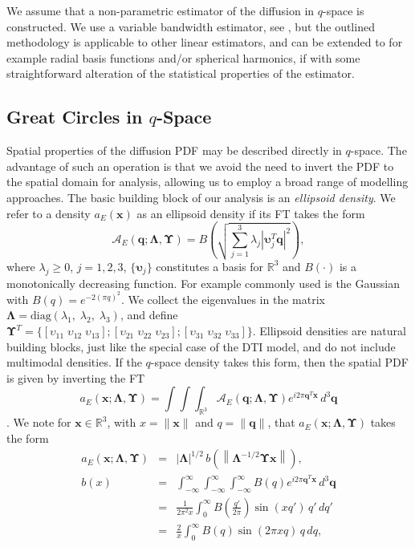 \documentclass[dvips,aoas,preprint]{imsart}
\numberwithin{equation}{section}
\theoremstyle{plain}
\newcommand{\q}{\mathbf{q}}
\newcommand{\bu}{\bs{\upsilon}}
\newcommand{\x}{\mathbf{x}}
\newcommand{\cA}{\mathcal{A}}
\newcommand{\bs}[1]{\boldsymbol{#1}}
\begin{document}
We assume that a non-parametric estimator of the diffusion in
$q$-space is constructed. We use a variable bandwidth estimator, see
\citet{OlhedeWhitcher,OlhedeWhitcherISBI}, but the outlined methodology
is applicable to other linear estimators, and can be extended to for
example radial basis functions and/or spherical harmonics, if with
some straightforward alteration of the statistical properties of the
estimator.

\subsection{Great Circles in $q$-Space}

Spatial properties of the diffusion PDF may be described directly in
$q$-space.  The advantage of such an operation is that we avoid the
need to invert the PDF to the spatial domain for analysis, allowing us
to employ a broad range of modelling approaches.  The basic building
block of our analysis is an {\em ellipsoid density}.  We refer to a
density $a_E(\x)$ as an ellipsoid density if its FT takes the form
\begin{equation}\label{ellipsoid}
  \cA_E\left(\q; \bm{\Lambda},\bm{\Upsilon}\right) =
  B\left(\sqrt{\sum_{j=1}^3\lambda_j\left|\bu_j^T\q\right|^2
  }\right),
\end{equation}
where $\lambda_j\ge{0}$, $j=1,2,3$, $\{\bu_j\}$ constitutes a basis
for ${\mathbb{R}}^3$ and $B(\cdot)$ is a monotonically decreasing
function.  For example commonly used is the Gaussian with
$B(q)=e^{-2(\pi q)^2}$.  We collect the eigenvalues in the matrix
$\bs{\Lambda}={\text{diag}}\left(\lambda_1,\;\lambda_2,\;\lambda_3\right)$,
and define
$\bm{\Upsilon}^T=\{[\upsilon_{11}\;\upsilon_{12}\;\upsilon_{13}];
[\upsilon_{21}\;\upsilon_{22}\;\upsilon_{23}];
[\upsilon_{31}\;\upsilon_{32}\;\upsilon_{33}]\}$.  Ellipsoid densities
are natural building blocks, just like the special case of the DTI
model, and do not include multimodal densities.  If the $q$-space
density takes this form, then the spatial PDF is given by inverting
the FT
\begin{equation}
  a_E(\x;\bm{\Lambda},\bm{\Upsilon}) = \int\int\int_{\mathbb{R}^3}
  \cA_E(\q; \bm{\Lambda},\bm{\Upsilon})e^{i2\pi \q^T\x} \, d^3 \q
\end{equation}
\citep{Callaghan}.  We note for $\x\in\mathbb{R}^3$, with $x=\|\x\|$
and $q=\|\q\|$, that $a_E(\x;\bm{\Lambda},\bm{\Upsilon})$ takes the
form
\begin{eqnarray}\label{ellipsoid2}
  a_E(\x;\bs{\Lambda},\bs{\Upsilon}) &=& |\bs{\Lambda}|^{1/2} \,
  b\left(\left\|\bs{\Lambda}^{-1/2}\bs{\Upsilon}\x\right\|\right),\\
  b(x) &=& \int_{-\infty}^{\infty} \int_{-\infty}^{\infty}
  \int_{-\infty}^{\infty} B(q) e^{i2\pi\q^T\x} \, d^3\q\\
  &=& \frac{1}{2\pi^2 x}\int_0^{\infty}
  B\left(\frac{q'}{2\pi}\right)\sin(xq')\,q'\,dq'\\
  &=& \frac{2}{x}\int_0^{\infty}B(q)\sin(2\pi xq) \,q\,dq,
  \nonumber
\end{eqnarray}
\end{document}
